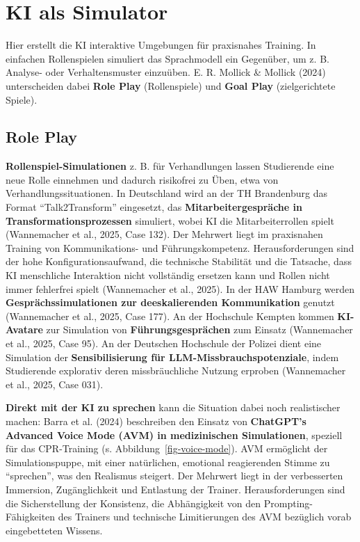 \documentclass[
  ngerman,
  letterpaper,
  DIV=11]{scrreprt}
\begin{document}
\section{KI als Simulator}\label{sec-simulator}

Hier erstellt die KI interaktive Umgebungen für praxisnahes Training. In
einfachen Rollenspielen simuliert das Sprachmodell ein Gegenüber, um z.
B. Analyse- oder Verhaltensmuster einzuüben. E. R. Mollick \& Mollick
(2024) unterscheiden dabei \textbf{Role Play} (Rollenspiele) und
\textbf{Goal Play} (zielgerichtete Spiele).

\subsection{Role Play}\label{sec-role-play}

\textbf{Rollenspiel-Simulationen} z. B. für Verhandlungen lassen
Studierende eine neue Rolle einnehmen und dadurch risikofrei zu Üben,
etwa von Verhandlungssituationen. In Deutschland wird an der TH
Brandenburg das Format ``Talk2Transform'' eingesetzt, das
\textbf{Mitarbeitergespräche in Transformationsprozessen} simuliert,
wobei KI die Mitarbeiterrollen spielt (Wannemacher et al., 2025, Case
132). Der Mehrwert liegt im praxisnahen Training von Kommunikations- und
Führungskompetenz. Herausforderungen sind der hohe
Konfigurationsaufwand, die technische Stabilität und die Tatsache, dass
KI menschliche Interaktion nicht vollständig ersetzen kann und Rollen
nicht immer fehlerfrei spielt (Wannemacher et al., 2025). In der HAW
Hamburg werden \textbf{Gesprächssimulationen zur deeskalierenden
Kommunikation} genutzt (Wannemacher et al., 2025, Case 177). An der
Hochschule Kempten kommen \textbf{KI-Avatare} zur Simulation von
\textbf{Führungsgesprächen} zum Einsatz (Wannemacher et al., 2025, Case
95). An der Deutschen Hochschule der Polizei dient eine Simulation der
\textbf{Sensibilisierung für LLM-Missbrauchspotenziale}, indem
Studierende explorativ deren missbräuchliche Nutzung erproben
(Wannemacher et al., 2025, Case 031).

\textbf{Direkt mit der KI zu sprechen} kann die Situation dabei noch
realistischer machen: Barra et al. (2024) beschreiben den Einsatz von
\textbf{ChatGPT's Advanced Voice Mode (AVM) in medizinischen
Simulationen}, speziell für das CPR-Training (s.
Abbildung~\ref{fig-voice-mode}). AVM ermöglicht der Simulationspuppe,
mit einer natürlichen, emotional reagierenden Stimme zu ``sprechen'',
was den Realismus steigert. Der Mehrwert liegt in der verbesserten
Immersion, Zugänglichkeit und Entlastung der Trainer. Herausforderungen
sind die Sicherstellung der Konsistenz, die Abhängigkeit von den
Prompting-Fähigkeiten des Trainers und technische Limitierungen des AVM
bezüglich vorab eingebetteten Wissens.
\end{document}

